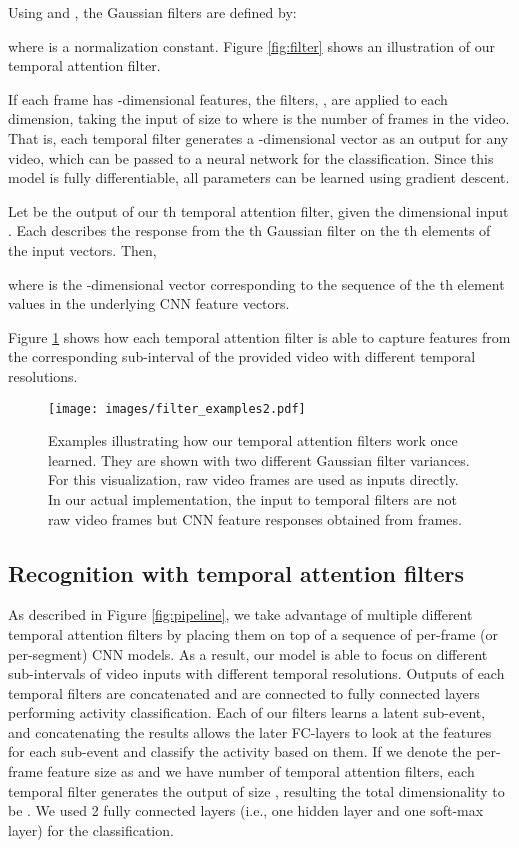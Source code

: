 \documentclass[letterpaper]{article}
\begin{document}
Using  and , the  Gaussian filters are defined by:

where  is a normalization constant. Figure \ref{fig:filter} shows an illustration of our temporal attention filter.

If each frame has -dimensional features, the filters, , are applied to each dimension, taking the input of size  to  where  is the number of frames in the video. That is, each temporal filter  generates a -dimensional vector as an output for any video, which can be passed to a neural network for the classification. Since this model is fully differentiable, all parameters can be learned using gradient descent.

Let  be the output of our th temporal attention filter, given the  dimensional input . Each  describes the response from the th Gaussian filter on the th elements of the input vectors. Then,

where  is the -dimensional vector corresponding to the sequence of the th element values in the underlying CNN feature vectors.

Figure \ref{fig:filter_example} shows how each temporal attention filter is able to capture features from the corresponding sub-interval of the provided video with different temporal resolutions.


\begin{figure}[!tbp]
\begin{center}
   \texttt{[image: images/filter\_examples2.pdf]}
\end{center}
   \caption{Examples illustrating how our temporal attention filters work once learned. They are shown with two different Gaussian filter variances. For this visualization, raw video frames are used as inputs directly. In our actual implementation, the input to temporal filters are not raw video frames but CNN feature responses obtained from frames.}
\label{fig:filter_example}		
\end{figure}




\subsection{Recognition with temporal attention filters}
\label{subsec:recognition}

As described in Figure \ref{fig:pipeline}, we take advantage of multiple different temporal attention filters by placing them on top of a sequence of per-frame (or per-segment) CNN models. As a result, our model is able to focus on different sub-intervals of video inputs with different temporal resolutions. Outputs of each temporal filters are concatenated and are connected to fully connected layers performing activity classification. Each of our filters learns a latent sub-event, and concatenating the results allows the later FC-layers to look at the features for each sub-event and classify the activity based on them. If we denote the per-frame feature size as  and we have  number of temporal attention filters, each temporal filter generates the output of size , resulting the total dimensionality to be . We used 2 fully connected layers (i.e., one hidden layer and one soft-max layer) for the classification. 
\end{document}
